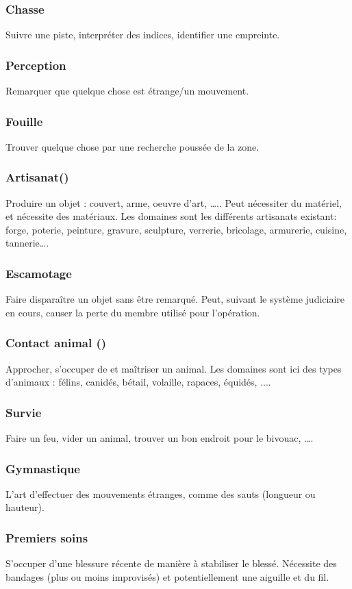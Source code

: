 \documentclass[10pt,a4paper,twocolumn]{book}
\begin{document}
\subsubsection{Chasse}
Suivre une piste, interpréter des indices, identifier une empreinte.
\subsubsection{Perception}
Remarquer que quelque chose est étrange/un mouvement.
\subsubsection{Fouille}
Trouver quelque chose par une recherche poussée de la zone.
\subsubsection{Artisanat()}
Produire un objet : couvert, arme, oeuvre d’art, ….. Peut nécessiter du matériel, et nécessite des matériaux. Les domaines sont les différents artisanats existant: forge, poterie, peinture, gravure, sculpture, verrerie, bricolage, armurerie, cuisine, tannerie….
\subsubsection{Escamotage}
Faire disparaître un objet sans être remarqué. Peut, suivant le système judiciaire en cours, causer la perte du membre utilisé pour l’opération.
\subsubsection{Contact animal ()}
Approcher, s’occuper de et maîtriser un animal. Les domaines sont ici des types d’animaux : félins, canidés, bétail, volaille, rapaces, équidés, ....
\subsubsection{Survie}
Faire un feu, vider un animal, trouver un bon endroit pour le bivouac, ….
\subsubsection{Gymnastique}
L’art d’effectuer des mouvements étranges, comme des sauts (longueur ou hauteur).
\subsubsection{Premiers soins}
S’occuper d’une blessure récente de manière à stabiliser le blessé. Nécessite des bandages (plus ou moins improvisés) et potentiellement une aiguille et du fil.
\end{document}

